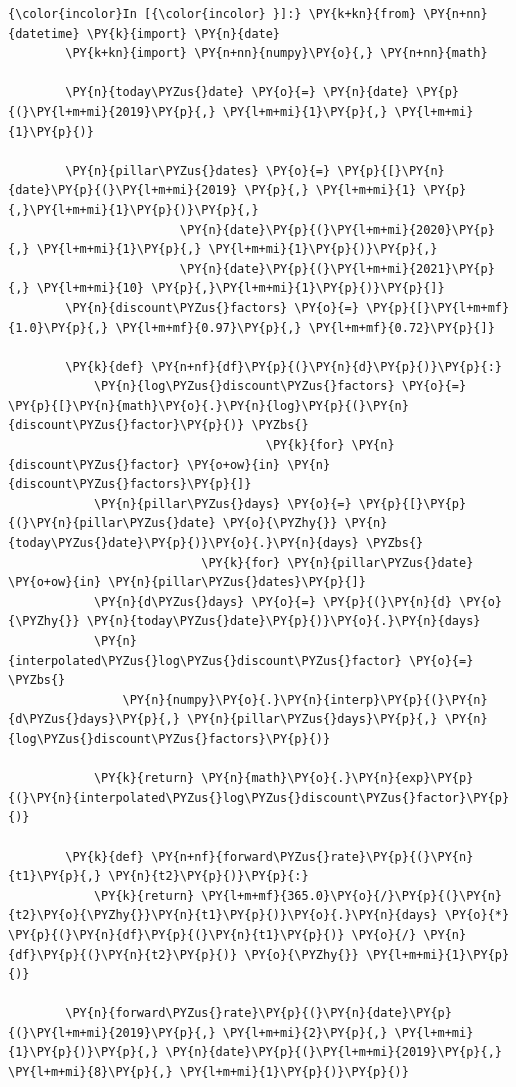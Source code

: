     \begin{Verbatim}[commandchars=\\\{\}]
{\color{incolor}In [{\color{incolor} }]:} \PY{k+kn}{from} \PY{n+nn}{datetime} \PY{k}{import} \PY{n}{date}
        \PY{k+kn}{import} \PY{n+nn}{numpy}\PY{o}{,} \PY{n+nn}{math}
        
        \PY{n}{today\PYZus{}date} \PY{o}{=} \PY{n}{date} \PY{p}{(}\PY{l+m+mi}{2019}\PY{p}{,} \PY{l+m+mi}{1}\PY{p}{,} \PY{l+m+mi}{1}\PY{p}{)}
        
        \PY{n}{pillar\PYZus{}dates} \PY{o}{=} \PY{p}{[}\PY{n}{date}\PY{p}{(}\PY{l+m+mi}{2019} \PY{p}{,} \PY{l+m+mi}{1} \PY{p}{,}\PY{l+m+mi}{1}\PY{p}{)}\PY{p}{,} 
                        \PY{n}{date}\PY{p}{(}\PY{l+m+mi}{2020}\PY{p}{,} \PY{l+m+mi}{1}\PY{p}{,} \PY{l+m+mi}{1}\PY{p}{)}\PY{p}{,} 
                        \PY{n}{date}\PY{p}{(}\PY{l+m+mi}{2021}\PY{p}{,} \PY{l+m+mi}{10} \PY{p}{,}\PY{l+m+mi}{1}\PY{p}{)}\PY{p}{]}
        \PY{n}{discount\PYZus{}factors} \PY{o}{=} \PY{p}{[}\PY{l+m+mf}{1.0}\PY{p}{,} \PY{l+m+mf}{0.97}\PY{p}{,} \PY{l+m+mf}{0.72}\PY{p}{]}
        
        \PY{k}{def} \PY{n+nf}{df}\PY{p}{(}\PY{n}{d}\PY{p}{)}\PY{p}{:}
            \PY{n}{log\PYZus{}discount\PYZus{}factors} \PY{o}{=} \PY{p}{[}\PY{n}{math}\PY{o}{.}\PY{n}{log}\PY{p}{(}\PY{n}{discount\PYZus{}factor}\PY{p}{)} \PYZbs{}
                                    \PY{k}{for} \PY{n}{discount\PYZus{}factor} \PY{o+ow}{in} \PY{n}{discount\PYZus{}factors}\PY{p}{]}
            \PY{n}{pillar\PYZus{}days} \PY{o}{=} \PY{p}{[}\PY{p}{(}\PY{n}{pillar\PYZus{}date} \PY{o}{\PYZhy{}} \PY{n}{today\PYZus{}date}\PY{p}{)}\PY{o}{.}\PY{n}{days} \PYZbs{}
                           \PY{k}{for} \PY{n}{pillar\PYZus{}date} \PY{o+ow}{in} \PY{n}{pillar\PYZus{}dates}\PY{p}{]}
            \PY{n}{d\PYZus{}days} \PY{o}{=} \PY{p}{(}\PY{n}{d} \PY{o}{\PYZhy{}} \PY{n}{today\PYZus{}date}\PY{p}{)}\PY{o}{.}\PY{n}{days}
            \PY{n}{interpolated\PYZus{}log\PYZus{}discount\PYZus{}factor} \PY{o}{=} \PYZbs{}
                \PY{n}{numpy}\PY{o}{.}\PY{n}{interp}\PY{p}{(}\PY{n}{d\PYZus{}days}\PY{p}{,} \PY{n}{pillar\PYZus{}days}\PY{p}{,} \PY{n}{log\PYZus{}discount\PYZus{}factors}\PY{p}{)}
            
            \PY{k}{return} \PY{n}{math}\PY{o}{.}\PY{n}{exp}\PY{p}{(}\PY{n}{interpolated\PYZus{}log\PYZus{}discount\PYZus{}factor}\PY{p}{)}
        
        \PY{k}{def} \PY{n+nf}{forward\PYZus{}rate}\PY{p}{(}\PY{n}{t1}\PY{p}{,} \PY{n}{t2}\PY{p}{)}\PY{p}{:}
            \PY{k}{return} \PY{l+m+mf}{365.0}\PY{o}{/}\PY{p}{(}\PY{n}{t2}\PY{o}{\PYZhy{}}\PY{n}{t1}\PY{p}{)}\PY{o}{.}\PY{n}{days} \PY{o}{*} \PY{p}{(}\PY{n}{df}\PY{p}{(}\PY{n}{t1}\PY{p}{)} \PY{o}{/} \PY{n}{df}\PY{p}{(}\PY{n}{t2}\PY{p}{)} \PY{o}{\PYZhy{}} \PY{l+m+mi}{1}\PY{p}{)}
        
        \PY{n}{forward\PYZus{}rate}\PY{p}{(}\PY{n}{date}\PY{p}{(}\PY{l+m+mi}{2019}\PY{p}{,} \PY{l+m+mi}{2}\PY{p}{,} \PY{l+m+mi}{1}\PY{p}{)}\PY{p}{,} \PY{n}{date}\PY{p}{(}\PY{l+m+mi}{2019}\PY{p}{,} \PY{l+m+mi}{8}\PY{p}{,} \PY{l+m+mi}{1}\PY{p}{)}\PY{p}{)}
\end{Verbatim}

